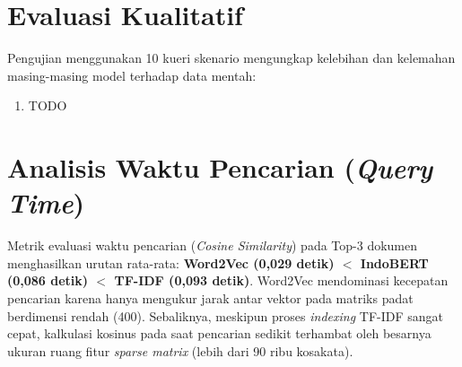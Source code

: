 \documentclass[12pt, a4paper]{article}
\begin{document}
\section{Evaluasi Kualitatif}
Pengujian menggunakan 10 kueri skenario mengungkap kelebihan dan kelemahan masing-masing model terhadap data mentah:
\begin{enumerate}
    \item TODO
\end{enumerate}

\section{Analisis Waktu Pencarian (\textit{Query Time})}
Metrik evaluasi waktu pencarian (\textit{Cosine Similarity}) pada Top-3 dokumen menghasilkan urutan rata-rata: \textbf{Word2Vec (0,029 detik) $<$ IndoBERT (0,086 detik) $<$ TF-IDF (0,093 detik)}.
Word2Vec mendominasi kecepatan pencarian karena hanya mengukur jarak antar vektor pada matriks padat berdimensi rendah (400). Sebaliknya, meskipun proses \textit{indexing} TF-IDF sangat cepat, kalkulasi kosinus pada saat pencarian sedikit terhambat oleh besarnya ukuran ruang fitur \textit{sparse matrix} (lebih dari 90 ribu kosakata).
\end{document}
